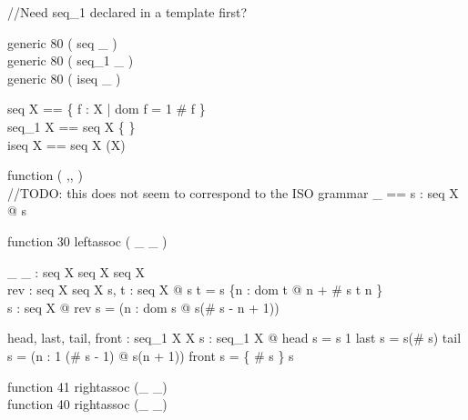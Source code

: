 //Need seq_1 declared in a template first?
\begin{zed}
  generic 80 ( seq \_ )\\
  generic 80 ( seq_1 \_ )\\
  generic 80 ( iseq \_ )
\end{zed}

\begin{zed}
  seq X == \{ f : \nat \ffun X | dom f = 1 \upto \# f \}\\
  seq_1 X == seq X \setminus \{ \emptyset \}\\
  iseq X == seq X \cap (\nat \pinj X)
\end{zed}

\begin{zed}
  function ( \langle ,, \rangle )\\
//TODO: this does not seem to correspond to the ISO grammar
  \langle \_ \rangle [X] == \lambda s : seq X @ s
\end{zed}

\begin{zed}
  function 30 leftassoc ( \_ \cat \_ )
\end{zed}

\begin{gendef}[X]
  \_ \cat \_ : seq X \cross seq X \fun seq X\\
  rev : seq X \fun seq X
\where
  \forall s, t : seq X @ s \cat t = s \cup \{n : dom t @ n + \# s \mapsto t n \}\\
  \forall s : seq X @ rev s = (\lambda n : dom s @ s(\# s - n + 1))
\end{gendef}

\begin{gendef}[X]
  head, last, tail, front : seq_1 X \fun X
\where
  \forall s : seq_1 X @
     head s = s 1 \land
     last s = s(\# s) \land
     tail s = (\lambda n : 1 \upto (\# s - 1) @ s(n + 1)) \land
     front s = \{ \# s \} \ndres s
\end{gendef}


\begin{zed}
  function 41 rightassoc (\_ \extract \_)\\
  function 40 rightassoc (\_ \filter \_)
\end{zed}

